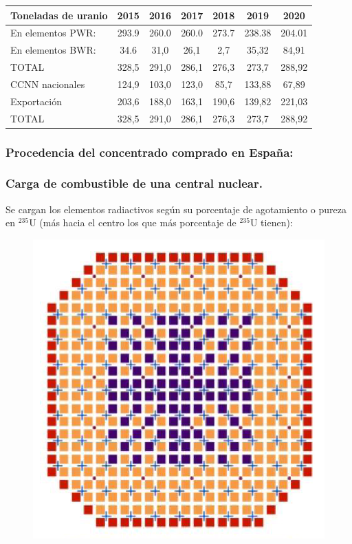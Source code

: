 			\begin{table}[H]
				\centering
				\renewcommand{\arraystretch}{1.1}
				\begin{tabular}{lcccccc}
					\hline
					{\textbf{Toneladas de uranio}} & \textbf{2015} & \textbf{2016} & \textbf{2017} & \textbf{2018} & \textbf{2019} & \textbf{2020}\\
					\hline
					En elementos PWR:&293.9&
					260.0&
					260.0&
					273.7&
					238.38&
					204.01\\ 
					En elementos BWR: & 34.6 & 31,0 & 26,1 & 2,7 & 35,32 & 84,91\\ 
					\hline
					TOTAL & 328,5 & 291,0 & 286,1 & 276,3 & 273,7 & 288,92 \\ 
					CCNN nacionales & 124,9 & 103,0 & 123,0 & 85,7 & 133,88 & 67,89 \\ 
					Exportación & 203,6 & 188,0 & 163,1 & 190,6 & 139,82 & 221,03 \\ 
					\hline
					TOTAL & 328,5 &291,0 & 286,1 & 276,3 & 273,7 & 288,92\\
					\hline
				\end{tabular}
			\end{table}
			
		\subsubsection{Procedencia del concentrado comprado en España:}
			\begin{center}
			\end{center}
			
		\subsubsection{Carga de combustible de una central nuclear.}
			Se cargan los elementos radiactivos según su porcentaje de agotamiento o pureza en $^{235}$U (más hacia el centro los que más porcentaje de $^{235}$U tienen):
			\begin{figure}[H]
				\centering
				\includegraphics[width=0.3\linewidth]{res/tema1/cargaInicial}
				\label{fig:cargainicial}
			\end{figure}
			
